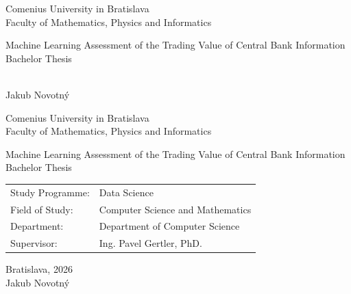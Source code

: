 \documentclass[12pt, oneside]{book}  %
\def\mfrok{2026}
\def\mfnazov{Machine Learning Assessment of the Trading Value of Central Bank Information}
\def\mftyp{Bachelor Thesis}
\def\mfautor{Jakub Novotný}
\def\mfskolitel{Ing. Pavel Gertler, PhD. }
\def\mfkonzultant{tit. Meno Priezvisko, tit. }
\def\mfmiesto{Bratislava, \mfrok}
\def\mfodbor{ Computer Science and Mathematics }
\def\program{ Data Science }
\def\mfpracovisko{ Department of Computer Science }
\begin{document}
     
\frontmatter
\pagestyle{empty}


\begin{center}
  \sc\large
  Comenius University in Bratislava\\
  Faculty of Mathematics, Physics and Informatics

\vfill

{\LARGE\mfnazov}\\
\mftyp
\end{center}

\vfill

{\sc\large 
\noindent \mfrok\\
\mfautor
}

\cleardoublepage


\noindent

\begin{center}
\sc  
\large
  Comenius University in Bratislava\\
  Faculty of Mathematics, Physics and Informatics

\vfill

{\LARGE\mfnazov}\\
\mftyp
\end{center}

\vfill

\noindent
\begin{tabular}{ll}
Study Programme: & \program \\
Field of Study: & \mfodbor \\
Department: & \mfpracovisko \\
Supervisor: & \mfskolitel \\
\end{tabular}

\vfill


\noindent \mfmiesto\\
\mfautor

\cleardoublepage



\newpage
\setcounter{page}{3}

\end{document}
